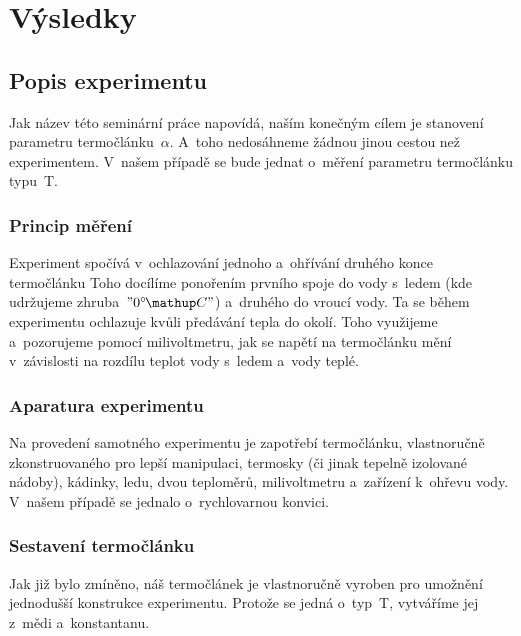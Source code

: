
\section{Výsledky}
\subsection{Popis experimentu}
Jak název této seminární práce napovídá, naším konečným cílem je stanovení
parametru termočlánku~$\alpha$. A~toho nedosáhneme žádnou jinou cestou než
experimentem. V~našem případě se bude jednat o~měření parametru termočlánku
typu~T.

\subsubsection{Princip měření}
Experiment spočívá v~ochlazování jednoho a~ohřívání druhého konce termočlánku%
 Toho docílíme ponořením prvního
spoje do vody s~ledem (kde udržujeme zhruba~$"0 \C"$) a~druhého do vroucí vody.
Ta se během experimentu ochlazuje kvůli předávání tepla do okolí. Toho
využijeme a~pozorujeme pomocí milivoltmetru, jak se napětí na termočlánku
mění v~závislosti na rozdílu teplot vody s~ledem a~vody teplé.

\subsubsection{Aparatura experimentu}
Na provedení samotného experimentu je zapotřebí termočlánku, vlastnoručně
zkonstruovaného pro lepší manipulaci, termosky (či jinak tepelně izolované
nádoby), kádinky, ledu, dvou teploměrů, milivoltmetru a~zařízení k~ohřevu vody.
V~našem případě se jednalo o~rychlovarnou konvici.

\subsubsection{Sestavení termočlánku}
Jak již bylo zmíněno, náš termočlánek je vlastnoručně vyroben pro umožnění
jednodušší konstrukce experimentu. Protože se jedná o~typ~T, vytváříme jej
z~mědi a~konstantanu. 

